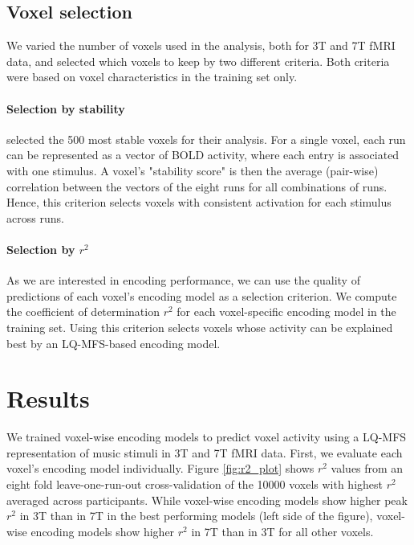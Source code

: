 \subsection*{Voxel selection}

We varied the number of voxels used in the analysis, both for 3T and 7T f{MRI} data, and selected which voxels to keep by two different criteria. Both criteria were based on voxel characteristics in the training set only.

\paragraph{Selection by stability}

\citet{ML08} selected the 500 most stable voxels for their analysis. For a single voxel, each run can be represented as a vector of BOLD activity, where each entry is associated with one stimulus. A voxel's "stability score" is then the average (pair-wise) correlation between the vectors of the eight runs for all combinations of runs. Hence, this criterion selects voxels with consistent activation for each stimulus across runs.

\paragraph{Selection by $r^2$}

As we are interested in encoding performance, we can use the quality of predictions of each voxel's encoding model as a selection criterion. We compute the coefficient of determination $r^2$ for each voxel-specific encoding model in the training set. Using this criterion selects voxels whose activity can be explained best by an LQ-MFS-based encoding model.

\section*{Results}

We trained voxel-wise encoding models to predict voxel activity using a LQ-MFS representation of music stimuli in 3T and 7T f{MRI} data.
First, we evaluate each voxel's encoding model individually. Figure \ref{fig:r2_plot} shows $r^{2}$ values from an eight fold leave-one-run-out cross-validation of the 10000 voxels with highest $r^{2}$ averaged across participants. While voxel-wise encoding models show higher peak $r^{2}$ in 3T than in 7T in the best performing models (left side of the figure), voxel-wise encoding models show higher $r^{2}$ in 7T than in 3T for all other voxels.

